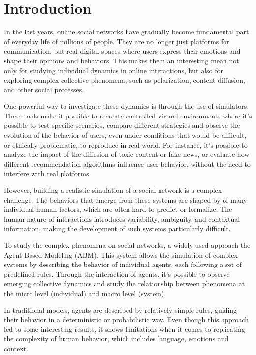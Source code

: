 \section{Introduction}
\label{sec:introduction}

In the last years, online social networks have gradually become fundamental part of everyday life of millions of people.
They are no longer just platforms for communication, but real digital spaces where users express their emotions and shape their opinions and behaviors.
This makes them an interesting mean not only for studying individual dynamics in online interactions, but also for exploring complex collective phenomena, such as polarization, content diffusion, and other social processes.

\medskip
One powerful way to investigate these dynamics is through the use of simulators.
These tools make it possible to recreate controlled virtual environments where it's possible to test specific scenarios, compare different strategies and observe the evolution of the behavior of users, even under conditions that would be difficult, or ethically problematic, to reproduce in real world.
For instance, it's possible to analyze the impact of the diffusion of toxic content or fake news, or evaluate how different recommendation algorithms influence user behavior, without the need to interfere with real platforms.

However, building a realistic simulation of a social network is a complex challenge.
The behaviors that emerge from these systems are shaped by of many individual human factors, which are often hard to predict or formalize.
The human nature of interactions introduces variability, ambiguity, and contextual information, making the development of such systems particularly difficult.


\medskip
To study the complex phenomena on social networks, a widely used approach the Agent-Based Modeling (ABM).
This system allows the simulation of complex systems by describing the behavior of individual agents, each following a set of predefined rules.
Through the interaction of agents, it's possible to observe emerging collective dynamics and study the relationship between phenomena at the micro level (individual) and macro level (system).

In traditional models, agents are described by relatively simple rules, guiding their behavior in a deterministic or probabilistic way.
Even though this approach led to some interesting results, it shows limitations when it comes to replicating the complexity of human behavior, which includes language, emotions and context.

